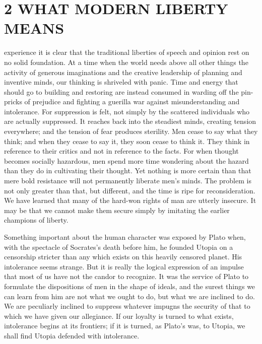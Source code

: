 \documentclass[openany,nobib,nohyper]{tufte-book}
\let\oldchapter\chapter
\def\chapter{%
  \setcounter{footnote}{0}%
  \oldchapter
}
\begin{document}
\newpage
\thispagestyle{plain} %
\mbox{}

\chapter[2 \hspace*{1mm} WHAT MODERN LIBERTY MEANS]{2 WHAT MODERN LIBERTY MEANS}
\label{ch:MODERN-LIBERTY}

 experience it is clear that the traditional liberties of
speech and opinion rest on no solid foundation. At a time when the world
needs above all other things the activity of generous imaginations and
the creative leadership of planning and inventive minds, our thinking is
shriveled with panic. Time and energy that should go to building and
restoring are instead consumed in warding off the pin-pricks of
prejudice and fighting a guerilla war against misunderstanding and
intolerance. For suppression is felt, not simply by the scattered
individuals who are actually suppressed. It reaches back into the
steadiest minds, creating tension everywhere; and the tension of fear
produces sterility. Men cease to say what they think; and when they
cease to say it, they soon cease to think it. They think in reference to
their critics and not in reference to the facts. For when thought
becomes socially hazardous, men spend more time wondering about the
hazard than they do in cultivating their thought. Yet nothing is more
certain than that mere bold resistance will not permanently liberate
men's minds. The problem is not only greater than that, but different,
and the time is ripe for reconsideration. We have learned that many of
the hard-won rights of man are utterly insecure. It may be that we
cannot make them secure simply by imitating the earlier champions of
liberty.

\enlargethispage{\baselineskip}

Something important about the human character was exposed by Plato when,
with the spectacle of Socrates's death before him, he founded Utopia on
a censorship stricter than any which exists on this heavily censored
planet. His intolerance seems strange. But it is really the logical
expression of an impulse that most of us have not the candor to
recognize. It was the service of Plato to formulate the dispositions of
men in the shape of ideals, and the surest things we can learn from him
are not what we ought to do, but what we are inclined to do. We are
peculiarly inclined to suppress whatever impugns the security of that to
which we have given our allegiance. If our loyalty is turned to what
exists, intolerance begins at its frontiers; if it is turned, as Plato's
was, to Utopia, we shall find Utopia defended with intolerance.
\end{document}
